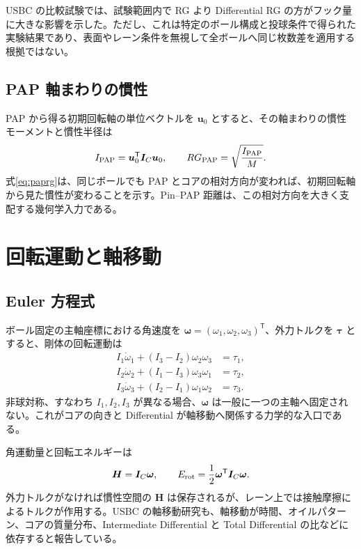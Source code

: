\documentclass[11pt,a4paper]{article}
\newcommand{\vect}[1]{\bm{#1}}
\newcommand{\mat}[1]{\bm{#1}}
\begin{document}
USBC の比較試験では、試験範囲内で RG より Differential RG の方がフック量に大きな影響を示した\cite{usbc_rgstudy}。ただし、これは特定のボール構成と投球条件で得られた実験結果であり、表面やレーン条件を無視して全ボールへ同じ枚数差を適用する根拠ではない。

\subsection{PAP 軸まわりの慣性}

PAP から得る初期回転軸の単位ベクトルを $\vect u_0$ とすると、その軸まわりの慣性モーメントと慣性半径は
\begin{equation}
 I_{\rm PAP}=\vect u_0^{\mathsf T}\mat I_C\vect u_0,
 \qquad
 RG_{\rm PAP}=\sqrt{\frac{I_{\rm PAP}}{M}}.
 \label{eq:paprg}
\end{equation}
式\eqref{eq:paprg}は、同じボールでも PAP とコアの相対方向が変われば、初期回転軸から見た慣性が変わることを示す。Pin--PAP 距離は、この相対方向を大きく支配する幾何学入力である。

\section{回転運動と軸移動}

\subsection{Euler 方程式}

ボール固定の主軸座標における角速度を
$\vect\omega=(\omega_1,\omega_2,\omega_3)^{\mathsf T}$、外力トルクを $\vect\tau$ とすると、剛体の回転運動は
\begin{align}
 I_1\dot\omega_1+(I_3-I_2)\omega_2\omega_3&=\tau_1,\\
 I_2\dot\omega_2+(I_1-I_3)\omega_3\omega_1&=\tau_2,\\
 I_3\dot\omega_3+(I_2-I_1)\omega_1\omega_2&=\tau_3.
 \label{eq:euler}
\end{align}
非球対称、すなわち $I_1,I_2,I_3$ が異なる場合、$\vect\omega$ は一般に一つの主軸へ固定されない。これがコアの向きと Differential が軸移動へ関係する力学的な入口である。

角運動量と回転エネルギーは
\begin{equation}
 \vect H=\mat I_C\vect\omega,
 \qquad
 E_{\rm rot}=\frac12\vect\omega^{\mathsf T}\mat I_C\vect\omega.
\end{equation}
外力トルクがなければ慣性空間の $\vect H$ は保存されるが、レーン上では接触摩擦によるトルクが作用する。USBC の軸移動研究も、軸移動が時間、オイルパターン、コアの質量分布、Intermediate Differential と Total Differential の比などに依存すると報告している\cite{usbc_axis}。
\end{document}
